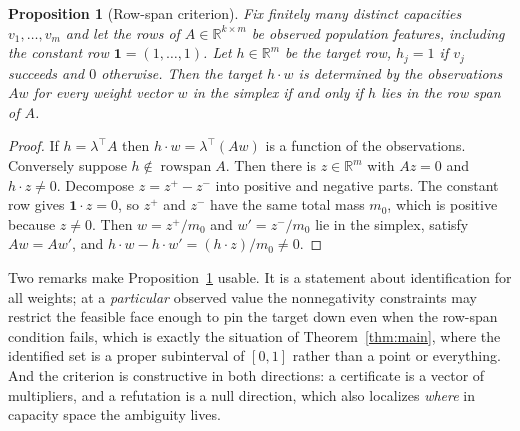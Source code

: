 \documentclass[11pt]{article}
\newtheorem{proposition}[theorem]{Proposition}
\theoremstyle{definition}
\newcommand{\R}{\mathbb R}
\newcommand{\ind}{\mathbf 1}
\begin{document}
\begin{proposition}[Row-span criterion]\label{prop:rowspan}
Fix finitely many distinct capacities $v_1,\dots,v_m$ and let the rows of
$A\in\R^{k\times m}$ be observed population features, including the constant
row $\ind=(1,\dots,1)$. Let $h\in\R^m$ be the target row, $h_j=1$ if $v_j$
succeeds and $0$ otherwise. Then the target $h\cdot w$ is determined by the
observations $Aw$ for \emph{every} weight vector $w$ in the simplex if and only
if $h$ lies in the row span of $A$.
\end{proposition}
\begin{proof}
If $h=\lambda^\top A$ then $h\cdot w=\lambda^\top(Aw)$ is a function of the
observations. Conversely suppose $h\notin\operatorname{rowspan}A$. Then there
is $z\in\R^m$ with $Az=0$ and $h\cdot z\ne0$. Decompose $z=z^+-z^-$ into
positive and negative parts. The constant row gives $\ind\cdot z=0$, so
$z^+$ and $z^-$ have the same total mass $m_0$, which is positive because
$z\ne0$. Then $w=z^+/m_0$ and $w'=z^-/m_0$ lie in the simplex, satisfy
$Aw=Aw'$, and $h\cdot w-h\cdot w'=(h\cdot z)/m_0\ne0$.
\end{proof}

Two remarks make Proposition~\ref{prop:rowspan} usable. It is a statement about
identification for all weights; at a \emph{particular} observed value the
nonnegativity constraints may restrict the feasible face enough to pin the
target down even when the row-span condition fails, which is exactly the
situation of Theorem~\ref{thm:main}, where the identified set is a proper
subinterval of $[0,1]$ rather than a point or everything. And the criterion is
constructive in both directions: a certificate is a vector of multipliers, and
a refutation is a null direction, which also localizes \emph{where} in capacity
space the ambiguity lives.
\end{document}
